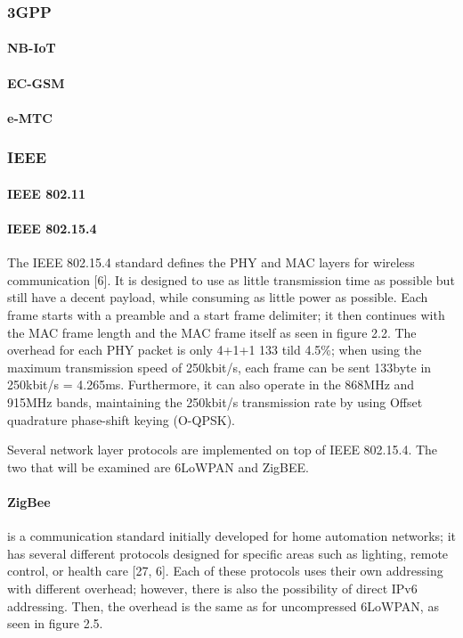 \subsubsection{3GPP}
\paragraph{NB-IoT}
\paragraph{EC-GSM}
\paragraph{e-MTC}


\subsubsection{IEEE}
\paragraph{IEEE 802.11}

\paragraph{IEEE 802.15.4}
The IEEE 802.15.4 standard defines the PHY and MAC layers for wireless communication [6].
It is designed to use as little transmission time as possible but still have a decent payload,
	while consuming as little power as possible.
Each frame starts with a preamble and a start frame delimiter;
	it then continues with the MAC frame length and the MAC frame itself as seen in figure 2.2.
The overhead for each PHY packet is only 4+1+1 133 tild 4.5\%;
	when
using the maximum transmission speed of 250kbit/s,
	each frame can be sent 133byte in 250kbit/s = 4.265ms.
Furthermore,
	it can also operate in the 868MHz and 915MHz bands,
	maintaining the 250kbit/s transmission rate by using Offset quadrature phase-shift keying (O-QPSK).

Several network layer protocols are implemented on top of IEEE 802.15.4.
The two that will be examined are 6LoWPAN and ZigBEE.

\paragraph{ZigBee} 
is a communication standard initially developed for home automation
networks; it has several different protocols designed for specific areas such
as lighting, remote control, or health care [27, 6]. Each of these protocols
uses their own addressing with different overhead; however, there is also the
possibility of direct IPv6 addressing. Then, the overhead is the same as for
uncompressed 6LoWPAN, as seen in figure 2.5.

